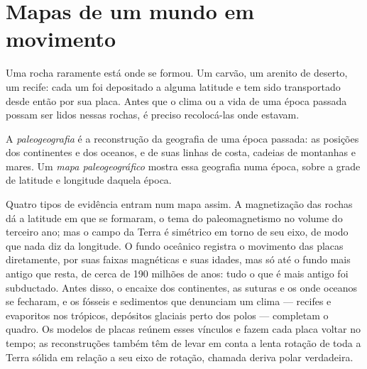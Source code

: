 \section{Mapas de um mundo em movimento}\label{sec:b2:phanerozoic-earth:maps}

Uma rocha raramente está onde se formou. Um carvão, um arenito de deserto, um recife: cada um foi depositado a
alguma latitude e tem sido transportado desde então por sua placa. Antes que o clima ou a vida de uma época
passada possam ser lidos nessas rochas, é preciso recolocá-las onde estavam.

\begin{definition}\label{def:b2:phanerozoic-earth:palaeogeography}
A \emph{paleogeografia} é a reconstrução da geografia de uma época
passada: as posições dos continentes e dos oceanos, e de suas linhas de costa, cadeias de montanhas e
mares. Um \emph{mapa paleogeográfico} mostra essa geografia numa
época, sobre a grade de latitude e longitude daquela época.
\end{definition}

Quatro tipos de evidência entram num mapa assim. A magnetização das rochas dá a latitude em
que se formaram, o tema do paleomagnetismo no volume do terceiro ano; mas o campo da Terra é
simétrico em torno de seu eixo, de modo que nada diz da longitude. O fundo oceânico registra o movimento das
placas diretamente, por suas faixas magnéticas e suas idades, mas só até o
fundo mais antigo que resta, de cerca de 190 milhões de anos: tudo o que é mais antigo foi subductado. Antes disso,
o encaixe dos continentes, as suturas e os  onde oceanos se fecharam, e os fósseis e
sedimentos que denunciam um clima --- recifes e evaporitos nos trópicos, depósitos glaciais perto dos
polos --- completam o quadro. Os modelos de placas reúnem esses vínculos e fazem cada placa voltar no
tempo; as reconstruções também têm de levar em conta a lenta rotação de toda a Terra sólida em relação
a seu eixo de rotação, chamada deriva polar verdadeira.

